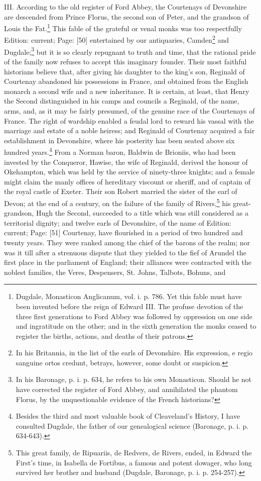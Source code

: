 III. According to the old register of Ford Abbey, the Courtenays of Devonshire are descended from Prince Florus, the second son of Peter, and the grandson of Louis the Fat.\footnote{Dugdale, Monasticon Anglicanum, vol. i. p. 786. Yet this fable must have been invented before the reign of Edward III. The profuse devotion of the three first generations to Ford Abbey was followed by oppression on one side and ingratitude on the other; and in the sixth generation the monks ceased to register the births, actions, and deaths of their patrons.} This fable of the grateful or venal monks was too respectfully Edition: current; Page: [50] entertained by our antiquaries, Camden\footnote{In his Britannia, in the list of the earls of Devonshire. His expression, e regio sanguine ortos credunt, betrays, however, some doubt or suspicion.} and Dugdale;\footnote{In his Baronage, p. i. p. 634, he refers to his own Monasticon. Should he not have corrected the register of Ford Abbey, and annihilated the phantom Florus, by the unquestionable evidence of the French historians?} but it is so clearly repugnant to truth and time, that the rational pride of the family now refuses to accept this imaginary founder. Their most faithful historians believe that, after giving his daughter to the king\texthebrew{}’s son, Reginald of Courtenay abandoned his possessions in France, and obtained from the English monarch a second wife and a new inheritance. It is certain, at least, that Henry the Second distinguished in his camps and councils a Reginald, of the name, arms, and, as it may be fairly presumed, of the genuine race of the Courtenays of France. The right of wardship enabled a feudal lord to reward his vassal with the marriage and estate of a noble heiress; and Reginald of Courtenay acquired a fair establishment in Devonshire, where his posterity has been seated above six hundred years.\footnote{Besides the third and most valuable book of Cleaveland\texthebrew{}’s History, I have consulted Dugdale, the father of our genealogical science (Baronage, p. i. p. 634-643).} From a Norman baron, Baldwin de Brioniis, who had been invested by the Conqueror, Hawise, the wife of Reginald, derived the honour of Okehampton, which was held by the service of ninety-three knights; and a female might claim the manly offices of hereditary viscount or sheriff, and of captain of the royal castle of Exeter. Their son Robert married the sister of the earl of Devon; at the end of a century, on the failure of the family of Rivers,\footnote{This great family, de Ripuariis, de Redvers, de Rivers, ended, in Edward the First\texthebrew{}’s time, in Isabella de Fortibus, a famous and potent dowager, who long survived her brother and husband (Dugdale, Baronage, p. i. p. 254-257).} his great-grandson, Hugh the Second, succeeded to a title which was still considered as a territorial dignity; and twelve earls of Devonshire, of the name of Edition: current; Page: [51] Courtenay, have flourished in a period of two hundred and twenty years. They were ranked among the chief of the barons of the realm; nor was it till after a strenuous dispute that they yielded to the fief of Arundel the first place in the parliament of England; their alliances were contracted with the noblest families, the Veres, Despensers, St. Johns, Talbots, Bohuns, and 